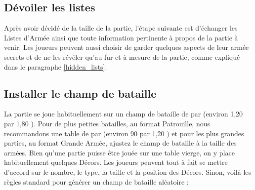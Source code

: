 \hypertarget{sharearmylist}{\subsection{Dévoiler les listes}}

Après avoir décidé de la taille de la partie, l'étape suivante est d'échanger les Listes d'Armée ainsi que toute information pertinente à propos de la partie à venir. Les joueurs peuvent aussi choisir de garder quelques aspects de leur armée secrets et de ne les révéler qu'au fur et à mesure de la partie, comme expliqué dans le paragraphe \ref{hidden_lists}.

\newpage
\hypertarget{buildbattlefield}{\subsection{Installer le champ de bataille}}

La partie se joue habituellement sur un champ de bataille de  par  (environ 1,20 {\meter} par 1,80 {\meter}). Pour de plus petites batailles, au format Patrouille, nous recommandons une table de  par  (environ 90 {\centi\meter} par 1,20 {\meter}) et pour les plus grandes parties, au format Grande Armée, ajustez le champ de bataille à la taille des armées. Bien qu'une partie puisse être jouée sur une table vierge, on y place habituellement quelques Décors. Les joueurs peuvent tout à fait se mettre d'accord sur le nombre, le type, la taille et la position des Décors. Sinon, voilà les règles standard pour générer un champ de bataille aléatoire :

